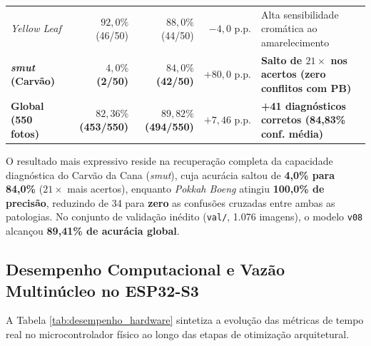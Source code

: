 \documentclass[12pt]{article}
\begin{document}
\begin{table}[htbp]
{\begin{tabular}{lrrrl}
\textit{Yellow Leaf} & $92,0\%$ (46/50) & $88,0\%$ (44/50) & $-4,0\text{ p.p.}$ & Alta sensibilidade cromática ao amarelecimento \\
\textbf{\textit{smut} (Carvão)} & \textbf{$4,0\%$ (2/50)} & \textbf{$84,0\%$ (42/50)} & \textbf{$+80,0\text{ p.p.}$} & \textbf{Salto de $21\times$ nos acertos (zero conflitos com PB)} \\ \midrule
\textbf{Global (550 fotos)} & \textbf{$82,36\%$ (453/550)} & \textbf{$89,82\%$ (494/550)} & \textbf{$+7,46\text{ p.p.}$} & \textbf{+41 diagnósticos corretos (84,83\% conf. média)} \\ \bottomrule
\end{tabular}%
}
\end{table}

O resultado mais expressivo reside na recuperação completa da capacidade diagnóstica do Carvão da Cana (\textit{smut}), cuja acurácia saltou de \textbf{4,0\% para 84,0\%} ($21\times$ mais acertos), enquanto \textit{Pokkah Boeng} atingiu \textbf{100,0\% de precisão}, reduzindo de 34 para \textbf{zero} as confusões cruzadas entre ambas as patologias. No conjunto de validação inédito (\texttt{val/}, 1.076 imagens), o modelo \texttt{v08} alcançou \textbf{89,41\% de acurácia global}.

\subsection{Desempenho Computacional e Vazão Multinúcleo no ESP32-S3}

A Tabela \ref{tab:desempenho_hardware} sintetiza a evolução das métricas de tempo real no microcontrolador físico ao longo das etapas de otimização arquitetural.
\end{document}
